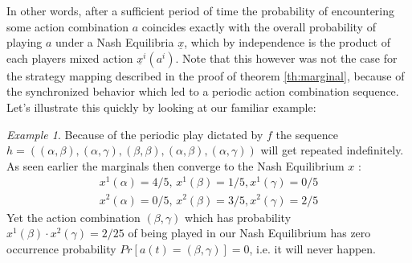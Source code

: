 \documentclass[a4paper]{article}
\theoremstyle{plain}
\theoremstyle{remark}
\newtheorem{example}{Example}
\newcommand{\eq}[1]{\underline{#1}}
\begin{document}
In other words, after a sufficient period of time the probability of encountering some action combination
$a$ coincides exactly with the overall probability of playing $a$ under a Nash Equilibria $\eq{x}$, 
which by independence is the product of each players mixed action $\eq{x}^i(a^i)$.
Note that this however was not the case for the strategy mapping described in the proof of theorem
\ref{th:marginal}, because of the synchronized behavior which led to a periodic action combination sequence.
Let's illustrate this quickly by looking at our familiar example:

\begin{example}
	Because of the periodic play dictated by $f$ the sequence $h = ((\alpha, \beta), (\alpha, \gamma), (\beta, \beta), (\alpha, \beta), (\alpha, \gamma))$
	will get repeated indefinitely. As seen earlier the marginals then converge to the Nash Equilibrium $x$ :
	\begin{gather*}
		x^1(\alpha) = 4/5, \, x^1(\beta) = 1/5, x^1(\gamma) = 0/5\\
		x^2(\alpha) = 0/5, \, x^2(\beta) = 3/5, x^2(\gamma) = 2/5
	\end{gather*}
	Yet the action combination $(\beta, \gamma)$ which has probability $x^1(\beta) \cdot x^2(\gamma) = 2/25$
	of being played in our Nash Equilibrium has zero occurrence probability $Pr[a(t) = (\beta, \gamma)] = 0$, i.e.
	it will never happen.
\end{example}
\end{document}
